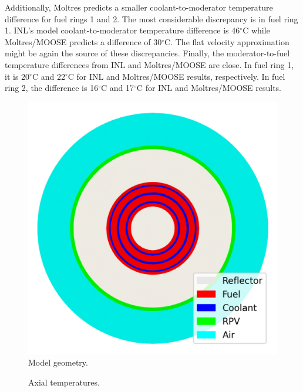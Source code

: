 Additionally, Moltres predicts a smaller coolant-to-moderator temperature difference for fuel rings 1 and 2.
The most considerable discrepancy is in fuel ring 1.
INL's model coolant-to-moderator temperature difference is 46$^{\circ}$C while Moltres/MOOSE predicts a difference of 30$^{\circ}$C.
The flat velocity approximation might be again the source of these discrepancies.
Finally, the moderator-to-fuel temperature differences from INL and Moltres/MOOSE are close.
In fuel ring 1, it is 20$^{\circ}$C and 22$^{\circ}$C for INL and Moltres/MOOSE results, respectively.
In fuel ring 2, the difference is 16$^{\circ}$C and 17$^{\circ}$C for INL and Moltres/MOOSE results.

\begin{figure}[htbp!]
  \centering
  \includegraphics[width=0.4\linewidth]{figures-thermal/ex2a-meshC2}
  \hfill
  \caption{Model geometry.}
  \label{fig:ex2a-2nd-model}
\end{figure}

\begin{figure}[htbp!]
  \centering
  \hfill
  \caption{Axial temperatures.}
  \label{fig:ex2a-temps}
\end{figure}

